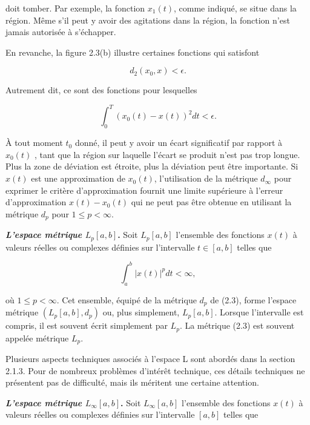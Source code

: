 \documentclass[10pt,twoside,a4paper]{book}
\begin{document}
\noindent
doit tomber. Par exemple, la fonction $x_1(t)$, comme indiqué, se situe dans la région. Même s'il peut y avoir des agitations dans la région, la fonction n'est jamais autorisée à s'échapper.

En revanche, la figure 2.3(b) illustre certaines fonctions qui satisfont

\begin{equation*}
  d_2(x_0, x) < \epsilon.
\end{equation*}

\noindent
Autrement dit, ce sont des fonctions pour lesquelles

\begin{equation*}
  \int_{0}^{T} (x_0(t) - x(t))^2 dt < \epsilon.
\end{equation*}

\noindent
À tout moment $t_0$ donné, il peut y avoir un écart significatif par rapport à $x_0(t)$ , tant que la région sur laquelle l'écart se produit n'est pas trop longue. Plus la zone de déviation est étroite, plus la déviation peut être importante. 
Si $x(t)$ est une approximation de $x_0(t)$, l'utilisation de la métrique $d_\infty$ pour exprimer le critère d'approximation fournit une limite supérieure à l'erreur d'approximation $x(t) - x_0(t)$ qui ne peut pas être obtenue en utilisant la métrique $d_p$ pour $1 \leq p < \infty$.

\vspace{4mm}
\noindent
\textbf{\textit{L'espace métrique} $L_p[a, b]$.} Soit $L_p[a, b]$ l'ensemble des fonctions $x(t)$ à valeurs réelles ou complexes définies sur l'intervalle $t \in [a, b]$ telles que

\begin{equation*}
  \int_{a}^{b} |x(t)|^p dt < \infty,
\end{equation*}

\noindent
où $1 \leq p < \infty$. Cet ensemble, équipé de la métrique $d_p$ de (2.3), forme l'espace métrique $(L_p[a, b], d_p)$ ou, plus simplement, $L_p[a, b]$. Lorsque l'intervalle est compris, il est souvent écrit simplement par $L_p$. La métrique (2.3) est souvent appelée métrique $L_p$.

Plusieurs aspects techniques associés à l'espace L sont abordés dans la section 2.1.3. Pour de nombreux problèmes d'intérêt technique, ces détails techniques ne présentent pas de difficulté, mais ils méritent une certaine attention.

\vspace{4mm}
\noindent
\textbf{\textit{L'espace métrique} $L_\infty[a, b]$.} Soit $L_\infty[a, b]$ l'ensemble des fonctions $x(t)$ à valeurs réelles ou complexes définies sur l'intervalle $[a, b]$ telles que
\end{document}
